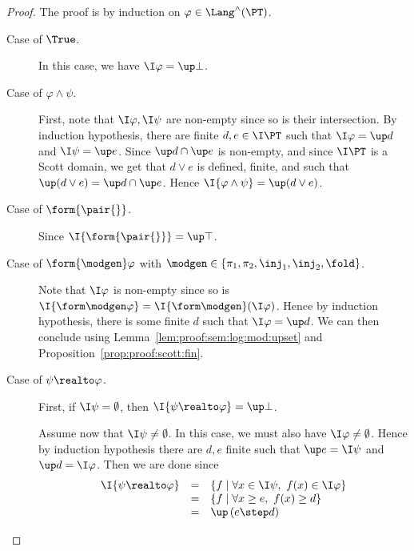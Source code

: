 \begin{proof}
The proof is by induction on $\varphi \in \Lang^\land(\PT)$.
\begin{description}
\item[Case of $\True$.]
In this case, we have $\I\varphi = \up \bot$.

\item[Case of $\varphi \land \psi$.]
First, note that $\I\varphi, \I\psi$ are non-empty since so is their intersection.
By induction hypothesis, there are finite $d,e \in \I\PT$
such that $\I\varphi = \up d$ and $\I\psi = \up e$.
Since $\up d \cap \up e$ is non-empty, and since $\I\PT$ is a Scott domain,
we get that $d \vee e$ is defined, finite, and such that
$\up(d\vee e) = \up d \cap \up e$.
Hence $\I{\varphi \land \psi} = \up(d \vee e)$.

\item[Case of $\form{\pair{}}$.]
Since $\I{\form{\pair{}}} = \up\top$.

\item[Case of $\form{\modgen}\varphi$
with $\modgen \in \{\pi_1, \pi_2, \inj_1, \inj_2, \fold\}$.]
Note that $\I\varphi$ is non-empty since so is
$\I{\form\modgen\varphi} = \I{\form\modgen}(\I\varphi)$.
Hence by induction hypothesis, there is some finite $d$
such that $\I\varphi = \up d$.
We can then conclude using Lemma~\ref{lem:proof:sem:log:mod:upset}
and Proposition~\ref{prop:proof:scott:fin}.

\item[Case of $\psi \realto \varphi$.]
First, if $\I\psi = \emptyset$,
then $\I{\psi \realto \varphi} = \up \bot$.

Assume now that $\I\psi \neq \emptyset$.
In this case, we must also have $\I\varphi \neq \emptyset$.
Hence by induction hypothesis there are $d,e$ finite
such that
$\up e = \I\psi$ and $\up d = \I\varphi$.
Then we are done since
\[
\begin{array}{l l l}
  \I{\psi \realto \varphi}
& =
& \left\{ f \mid \forall x \in \I\psi,~ f(x) \in \I\varphi\right\}
\\
%
& =
& \left\{ f \mid \forall x \geq e,~ f(x) \geq d\right\}
\\
%
& =
& \up \left(e \step d \right)
\end{array}
\]
\qedhere
\end{description}
\end{proof}


